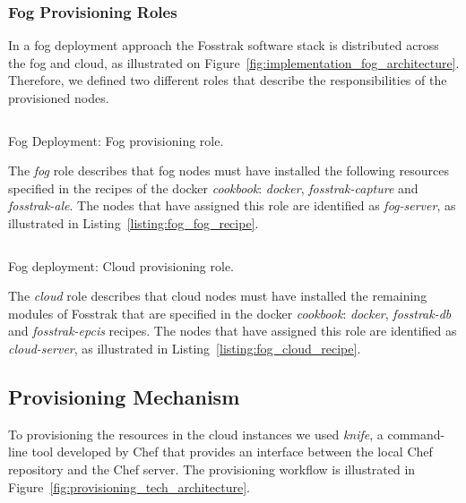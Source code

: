 \subsubsection{Fog Provisioning Roles}
\label{subs:fog_roles}
In a fog deployment approach the Fosstrak software stack is distributed across the fog and cloud,
as illustrated on Figure~\ref{fig:implementation_fog_architecture}. Therefore, we defined two different
roles that describe the responsibilities of the provisioned nodes.

\begin{listing}[ht!]
  \inputminted[frame=lines,
                 framesep=3mm,
                 linenos=true,
                 xleftmargin=21pt,
                 tabsize=4]{json}{./listings/fog_role.json}
  \caption{Fog Deployment: Fog provisioning role.}
  \label{listing:fog_fog_recipe}
\end{listing}

The \textit{fog} role describes that fog nodes must have installed the following resources specified in the
recipes of the docker \textit{cookbook}: \textit{docker}, \textit{fosstrak-capture} and
\textit{fosstrak-ale}. The nodes that have assigned this role are identified as \textit{fog-server},
as illustrated in Listing~\ref{listing:fog_fog_recipe}.\\

\begin{listing}[ht!]
  \inputminted[frame=lines,
                 framesep=3mm,
                 linenos=true,
                 xleftmargin=21pt,
                 tabsize=4]{json}{./listings/cloud_role.json}
  \caption{Fog deployment: Cloud provisioning role.}
  \label{listing:fog_cloud_recipe}
\end{listing}

The \textit{cloud} role describes that cloud nodes must have installed the remaining modules of Fosstrak
that are specified in the docker \textit{cookbook}: \textit{docker}, \textit{fosstrak-db} and
\textit{fosstrak-epcis} recipes. The nodes that have assigned this role are identified as
\textit{cloud-server}, as illustrated in Listing~\ref{listing:fog_cloud_recipe}.

\subsection{Provisioning Mechanism}
\label{sub:provisioning_mechanism}
To provisioning the resources in the cloud instances we used \textit{knife}, a command-line tool
developed by Chef that provides an interface between the local Chef repository and the Chef server.
The provisioning workflow is illustrated in Figure~\ref{fig:provisioning_tech_architecture}.\\

